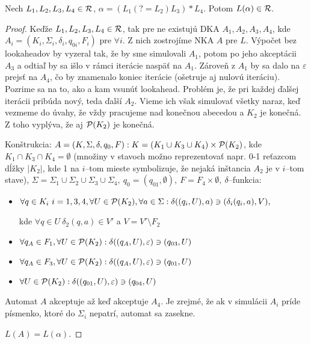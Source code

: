 \begin{veta}
Nech $L_1,L_2,L_3,L_4 \in \R$, $\alpha = \left( L_1 \left( ?=L_2\right) L_3 \right) * L_4$. Potom $L(\alpha) \in \R$.
\end{veta} 
\begin{proof}
Keďže $L_1,L_2,L_3,L_4 \in \R$, tak pre ne existujú DKA $A_1,A_2,A_3,A_4$, kde $A_i = \left( K_i, \Sigma_i, \delta_i, q_{0i}, F_i \right)$ pre $\forall i$. Z nich zostrojíme NKA $A$ pre $L$. Výpočet bez lookaheadov by vyzeral tak, že by sme simulovali $A_1$, potom po jeho akceptácii $A_3$ a odtiaľ by sa išlo v rámci iterácie naspäť na $A_1$. Zároveň z $A_1$ by sa dalo na $\varepsilon$ prejsť na $A_4$, čo by znamenalo koniec iterácie (ošetruje aj nulovú iteráciu). Pozrime sa na to, ako a kam vsunúť lookahead. Problém je, že pri každej ďalšej iterácii pribúda nový, teda ďalší $A_2$. Vieme ich však simulovať všetky naraz, keď vezmeme do úvahy, že vždy pracujeme nad konečnou abecedou a $K_2$ je konečná. Z toho vyplýva, že aj $\P(K_2)$ je konečná.

Konštrukcia: $A = (K,\Sigma ,\delta ,q_0,F) : K = (K_1\cup K_3\cup K_4)\times \P(K_2)$, kde $K_1 \cap K_3 \cap K_4 = \emptyset$ (množiny v stavoch možno reprezentovať napr. 0-1 reťazcom dĺžky $\left\vert{K_2}\right\vert$, kde 1 na $i$--tom mieste symbolizuje, že nejaká inštancia $A_2$ je v $i$--tom stave), $\Sigma = \Sigma_1 \cup \Sigma_2 \cup \Sigma_3 \cup \Sigma_4, ~q_0 = (q_{01},\emptyset ), ~ F = F_4\times \emptyset,~\delta$--funkcia:
 
\begin{itemize}
  \item $\forall q \in K_i~i=1,3,4,\forall U \in \P(K_2),\forall a \in \Sigma : \delta ((q_i,U),a) \ni (\delta _i (q_i,a),V),$
  
  kde $\forall q \in U~\delta_2(q,a) \in V'$ a  $V=V'\setminus F_2$
  \item $\forall q_A \in F_1, \forall U \in \P(K_2) : \delta ((q_A,U),\varepsilon ) \ni (q_{03},U)$
  \item $\forall q_A \in F_3, \forall U \in \P(K_2) : \delta ((q_A,U),\varepsilon ) \ni (q_{01},U)$
  \item $\forall U \in \P(K_2) : \delta ((q_{01},U),\varepsilon ) \ni (q_{04},U)$
\end{itemize}

Automat $A$ akceptuje až keď akceptuje $A_4$. Je zrejmé, že ak v simulácii $A_i$ príde písmenko, ktoré do $\Sigma_i$ nepatrí, automat sa zasekne.

$L(A) = L(\alpha).$


\end{proof}
